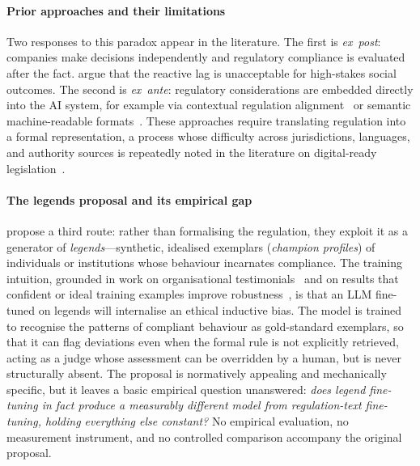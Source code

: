 \documentclass[pdflatex, sn-apa]{sn-jnl}%
\theoremstyle{thmstyleone}%
\theoremstyle{thmstyletwo}%
\theoremstyle{thmstylethree}%
\begin{document}
\paragraph{Prior approaches and their limitations}
Two responses to this paradox appear in the literature. The first is
\emph{ex~post}: companies make decisions independently and regulatory compliance
is evaluated after the fact. \citet{sargsyan2025legends} argue that the reactive
lag is unacceptable for high-stakes social outcomes. The second is
\emph{ex~ante}: regulatory considerations are embedded directly into the AI
system, for example via contextual regulation
alignment~\citep{achintalwar2024alignment} or semantic machine-readable
formats~\citep{mclaughlin2021x2rl}. These approaches require translating
regulation into a formal representation, a process whose difficulty across
jurisdictions, languages, and authority sources is repeatedly noted in the
literature on digital-ready legislation~\citep{motzfeldt2018digital}.
 
\paragraph{The legends proposal and its empirical gap}
\citet{sargsyan2025legends} propose a third route: rather than formalising the
regulation, they exploit it as a generator of \emph{legends}---synthetic,
idealised exemplars (\emph{champion profiles}) of individuals or institutions
whose behaviour incarnates compliance. The training intuition, grounded in work
on organisational testimonials~\citep{kanyamukenge2024testimonials} and on
results that confident or ideal training examples improve
robustness~\citep{northcutt2017cleaning}, is that an LLM fine-tuned on legends
will internalise an ethical inductive bias. The model is trained to recognise
the patterns of compliant behaviour as gold-standard
exemplars, so that it can flag
deviations even when the formal rule is not explicitly retrieved, acting as a
judge whose assessment can be overridden by a human, but is never structurally
absent. The proposal is normatively appealing and mechanically specific, but it
leaves a basic empirical question unanswered: \emph{does legend fine-tuning in
fact produce a measurably different model from regulation-text fine-tuning,
holding everything else constant?} No empirical evaluation, no measurement
instrument, and no controlled comparison accompany the original proposal. 
\end{document}
